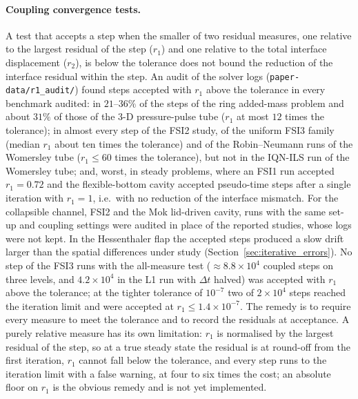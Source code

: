\paragraph{Coupling convergence tests.}
A test that accepts a step when the smaller of two residual measures, one relative to the largest residual of the step ($r_1$) and one relative to the total interface displacement ($r_2$), is below the tolerance does not bound the reduction of the interface residual within the step.
An audit of the solver logs (\texttt{paper-data/r1\_audit/}) found steps accepted with $r_1$ above the tolerance in every benchmark audited: in $21$--$36\%$ of the steps of the ring added-mass problem and about $31\%$ of those of the 3-D pressure-pulse tube ($r_1$ at most $12$ times the tolerance); in almost every step of the FSI2 study, of the uniform FSI3 family (median $r_1$ about ten times the tolerance) and of the Robin--Neumann runs of the Womersley tube ($r_1 \leq 60$ times the tolerance), but not in the IQN-ILS run of the Womersley tube; and, worst, in steady problems, where an FSI1 run accepted $r_1 = 0.72$ and the flexible-bottom cavity accepted pseudo-time steps after a single iteration with $r_1 = 1$, i.e.\ with no reduction of the interface mismatch.
For the collapsible channel, FSI2 and the Mok lid-driven cavity, runs with the same set-up and coupling settings were audited in place of the reported studies, whose logs were not kept.
In the Hessenthaler flap the accepted steps produced a slow drift larger than the spatial differences under study (Section~\ref{sec:iterative_errors}).
No step of the FSI3 runs with the all-measure test ($\approx8.8\times10^{4}$ coupled steps on three levels, and $4.2\times10^{4}$ in the L1 run with $\Delta t$ halved) was accepted with $r_1$ above the tolerance; at the tighter tolerance of $10^{-7}$ two of $2\times10^{4}$ steps reached the iteration limit and were accepted at $r_1 \leq 1.4\times10^{-7}$.
The remedy is to require every measure to meet the tolerance and to record the residuals at acceptance.
A purely relative measure has its own limitation: $r_1$ is normalised by the largest residual of the step, so at a true steady state the residual is at round-off from the first iteration, $r_1$ cannot fall below the tolerance, and every step runs to the iteration limit with a false warning, at four to six times the cost; an absolute floor on $r_1$ is the obvious remedy and is not yet implemented.

